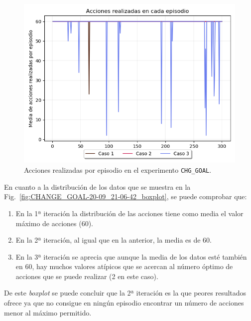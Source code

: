 \begin{figure}
    \centering
    \includegraphics[scale=0.4]{cap5_experimentacion/images/CHANGE_GOAL-20-09_21-06-42_acciones.png}
    \caption{Acciones realizadas por episodio en el experimento \texttt{CHG\_GOAL}.}
    \label{fig:CHANGE_GOAL-20-09_21-06-42_acciones}
\end{figure}

En cuanto a la distribución de los datos que se muestra en la Fig.~\ref{fig:CHANGE_GOAL-20-09_21-06-42_boxplot}, se puede comprobar que: 
\begin{enumerate}
    \item En la 1ª iteración la distribución de las acciones tiene como media el valor máximo de acciones (60). 
    \item En la 2ª iteración, al igual que en la anterior, la media es de 60.
    \item En la 3ª iteración se aprecia que aunque la media de los datos esté también en 60, hay muchos valores atípicos que se acercan al número óptimo de acciones que se puede realizar (2 en este caso).
\end{enumerate}

De este \textit{boxplot} se puede concluir que la 2ª iteración es la que peores resultados ofrece ya que no consigue en ningún episodio encontrar un número de acciones menor al máximo permitido. \\

